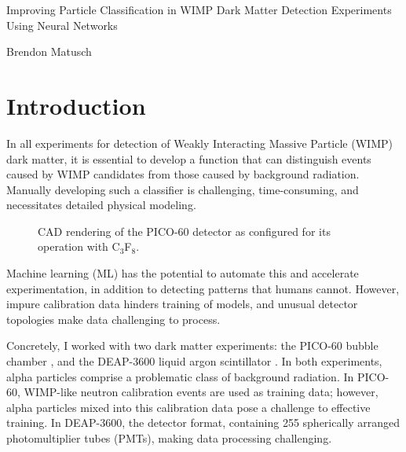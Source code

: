\documentclass[12pt]{article}
\begin{document}
\begin{center}
    \begin{LARGE}
        Improving Particle Classification in WIMP Dark Matter Detection Experiments Using Neural Networks
    \end{LARGE}

    Brendon Matusch
\end{center}

\section{Introduction}

In all experiments for detection of Weakly Interacting Massive Particle (WIMP) dark matter, it is essential to develop a function that can distinguish events caused by WIMP candidates from those caused by background radiation. Manually developing such a classifier is challenging, time-consuming, and necessitates detailed physical modeling.

\begin{figure}
    \centering
    \caption{CAD rendering of the PICO-60 detector as configured for its operation with C$_3$F$_8$.}
\end{figure}

Machine learning (ML) has the potential to automate this and accelerate experimentation, in addition to detecting patterns that humans cannot. However, impure calibration data hinders training of models, and unusual detector topologies make data challenging to process.

Concretely, I worked with two dark matter experiments: the PICO-60 bubble chamber \cite{pico}, and the DEAP-3600 liquid argon scintillator \cite{deap}. In both experiments, alpha particles comprise a problematic class of background radiation. In PICO-60, WIMP-like neutron calibration events are used as training data; however, alpha particles mixed into this calibration data pose a challenge to effective training. In DEAP-3600, the detector format, containing 255 spherically arranged photomultiplier tubes (PMTs), making data processing challenging.
\end{document}
